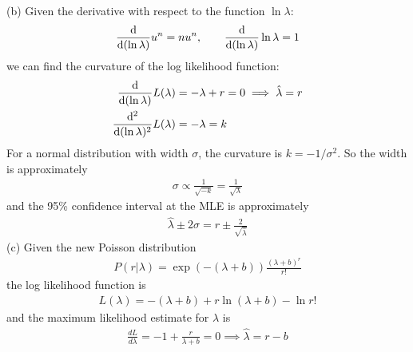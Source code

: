 \documentclass[../main.tex]{subfiles}
\begin{document}
(b) Given the derivative with respect to the function $\ln \lambda$:
\begin{align*}
    \dv{(\ln{\lambda})} u^n = nu^n, \qquad \dv{(\ln{\lambda})} \ln \lambda = 1
\end{align*}
we can find the curvature of the log likelihood function:
\begin{align*}
    \dv{(\ln \lambda)} L(\lambda) &= -\lambda + r = 0 \implies \hat \lambda = r \\
    \dv[2]{(\ln \lambda)} L(\lambda) &= -\lambda = k
\end{align*}
For a normal distribution with width $\sigma$, the curvature is $k = -1/\sigma^2$. So the width is
approximately
\begin{align*}
    \sigma \propto \frac{1}{\sqrt{-k}} = \frac{1}{\sqrt{\lambda}}
\end{align*}
and the 95\% confidence interval at the MLE is approximately
\begin{align*}
    \hat \lambda \pm 2\sigma = r \pm \frac{2}{\sqrt{\hat \lambda}}
\end{align*}
(c) Given the new Poisson distribution
\begin{align*}
    P(r | \lambda) = \exp(-(\lambda + b)) \frac{(\lambda + b)^r}{r!}
\end{align*}
the log likelihood function is
\begin{align*}
    L(\lambda) = -(\lambda + b) + r \ln(\lambda + b) - \ln r!
\end{align*}
and the maximum likelihood estimate for $\lambda$ is
\begin{align*}
    \frac{dL}{d\lambda} = -1 + \frac{r}{\lambda + b} = 0 \implies \hat \lambda = r - b
\end{align*}
\end{document}
